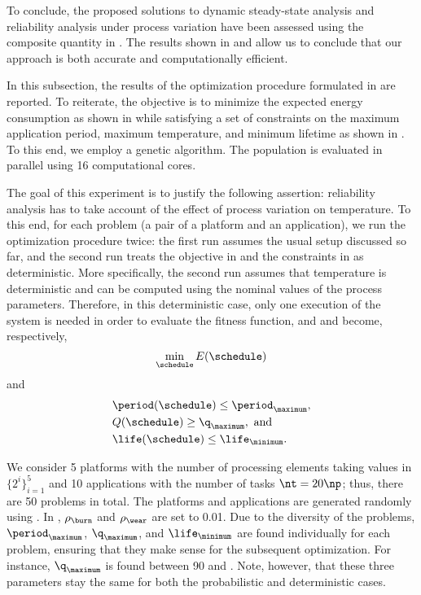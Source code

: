 To conclude, the proposed solutions to dynamic steady-state analysis and
reliability analysis under process variation have been assessed using the
composite quantity in . The results shown in
 and  allow us
to conclude that our approach is both accurate and computationally efficient.


In this subsection, the results of the optimization procedure formulated in
 are reported. To reiterate, the objective
is to minimize the expected energy consumption as shown in
 while satisfying a set of constraints on the
maximum application period, maximum temperature, and minimum lifetime as shown
in . To this end, we employ a genetic
algorithm. The population is evaluated in parallel using 16 computational cores.

The goal of this experiment is to justify the following assertion: reliability
analysis has to take account of the effect of process variation on temperature.
To this end, for each problem (a pair of a platform and an application), we run
the optimization procedure twice: the first run assumes the usual setup
discussed so far, and the second run treats the objective in
 and the constraints in
 as deterministic. More specifically, the
second run assumes that temperature is deterministic and can be computed using
the nominal values of the process parameters. Therefore, in this deterministic
case, only one execution of the system is needed in order to evaluate the
fitness function, and  and
 become, respectively,
\[
    \min_{\schedule} E(\schedule)
\]
and
\begin{align*}
  & \period(\schedule) \leq \period_\maximum, \\
  & Q(\schedule) \geq \q_\maximum, \text{ and} \\
  & \life(\schedule) \leq \life_\minimum.
\end{align*}

We consider 5 platforms with the number of processing elements \np taking values
in $\{ 2^i \}_{i = 1}^5$ and 10 applications with the number of tasks $\nt = 20
\np$; thus, there are 50 problems in total. The platforms and applications are
generated randomly using  \cite{dick1998}. In
, $\rho_\burn$ and $\rho_\wear$ are set to
0.01. Due to the diversity of the problems, $\period_\maximum$, $\q_\maximum$,
and $\life_\minimum$ are found individually for each problem, ensuring that they
make sense for the subsequent optimization. For instance, $\q_\maximum$ is found
between 90 and . Note, however, that these three parameters stay
the same for both the probabilistic and deterministic cases.

